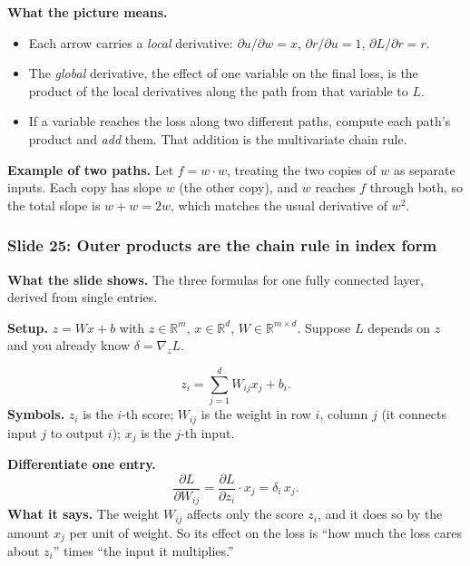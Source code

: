 \textbf{What the picture means.}
\begin{itemize}
\item Each arrow carries a \emph{local} derivative: $\partial u/\partial w=x$, $\partial r/\partial u=1$, $\partial L/\partial r=r$.
\item The \emph{global} derivative, the effect of one variable on the final loss, is the product of the local derivatives along the path from that variable to $L$.
\item If a variable reaches the loss along two different paths, compute each path's product and \emph{add} them. That addition is the multivariate chain rule.
\end{itemize}
\textbf{Example of two paths.} Let $f=w\cdot w$, treating the two copies of $w$ as separate inputs. Each copy has slope $w$ (the other copy), and $w$ reaches $f$ through both, so the total slope is $w+w=2w$, which matches the usual derivative of $w^2$.

\subsubsection{Slide 25: Outer products are the chain rule in index form}

\textbf{What the slide shows.} The three formulas for one fully connected layer, derived from single entries.

\textbf{Setup.} $z=Wx+b$ with $z\in\mathbb{R}^m$, $x\in\mathbb{R}^d$, $W\in\mathbb{R}^{m\times d}$. Suppose $L$ depends on $z$ and you already know $\delta=\nabla_zL$.

\[
z_i=\sum_{j=1}^{d}W_{ij}x_j + b_i .
\]
\textbf{Symbols.} $z_i$ is the $i$-th score; $W_{ij}$ is the weight in row $i$, column $j$ (it connects input $j$ to output $i$); $x_j$ is the $j$-th input.

\textbf{Differentiate one entry.}
\[
\frac{\partial L}{\partial W_{ij}} = \frac{\partial L}{\partial z_i}\cdot x_j = \delta_i\,x_j .
\]
\textbf{What it says.} The weight $W_{ij}$ affects only the score $z_i$, and it does so by the amount $x_j$ per unit of weight. So its effect on the loss is ``how much the loss cares about $z_i$'' times ``the input it multiplies.''

